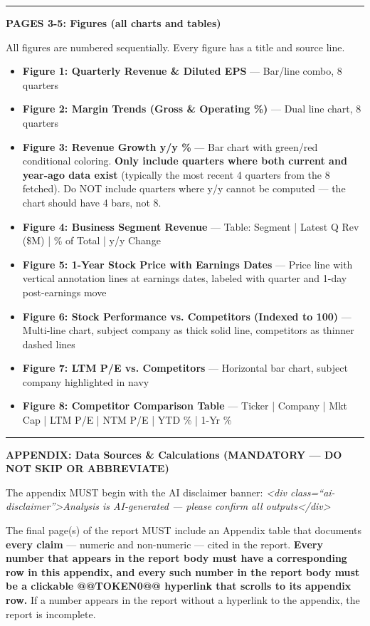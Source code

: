 \documentclass[11pt]{article}
\begin{document}
\vspace{0.5em}\hrule\vspace{0.5em}

\textbf{PAGES 3-5: Figures (all charts and tables)}


All figures are numbered sequentially. Every figure has a title and source line.


\begin{itemize}[leftmargin=*,itemsep=2pt,topsep=2pt]
\item {} \textbf{Figure 1: Quarterly Revenue \& Diluted EPS} — Bar/line combo, 8 quarters
\item {} \textbf{Figure 2: Margin Trends (Gross \& Operating \%)} — Dual line chart, 8 quarters
\item {} \textbf{Figure 3: Revenue Growth y/y \%} — Bar chart with green/red conditional coloring. \textbf{Only include quarters where both current and year-ago data exist} (typically the most recent 4 quarters from the 8 fetched). Do NOT include quarters where y/y cannot be computed — the chart should have 4 bars, not 8.
\item {} \textbf{Figure 4: Business Segment Revenue} — Table: Segment | Latest Q Rev (\$M) | \% of Total | y/y Change
\item {} \textbf{Figure 5: 1-Year Stock Price with Earnings Dates} — Price line with vertical annotation lines at earnings dates, labeled with quarter and 1-day post-earnings move
\item {} \textbf{Figure 6: Stock Performance vs. Competitors (Indexed to 100)} — Multi-line chart, subject company as thick solid line, competitors as thinner dashed lines
\item {} \textbf{Figure 7: LTM P/E vs. Competitors} — Horizontal bar chart, subject company highlighted in navy
\item {} \textbf{Figure 8: Competitor Comparison Table} — Ticker | Company | Mkt Cap | LTM P/E | NTM P/E | YTD \% | 1-Yr \%
\end{itemize}

\vspace{0.5em}\hrule\vspace{0.5em}

\textbf{APPENDIX: Data Sources \& Calculations (MANDATORY — DO NOT SKIP OR ABBREVIATE)}


The appendix MUST begin with the AI disclaimer banner: \emph{<div class=``ai-disclaimer''>Analysis is AI-generated — please confirm all outputs</div>}


The final page(s) of the report MUST include an Appendix table that documents \textbf{every claim} — numeric and non-numeric — cited in the report. \textbf{Every number that appears in the report body must have a corresponding row in this appendix, and every such number in the report body must be a clickable @@TOKEN0@@ hyperlink that scrolls to its appendix row.} If a number appears in the report without a hyperlink to the appendix, the report is incomplete.
\end{document}
